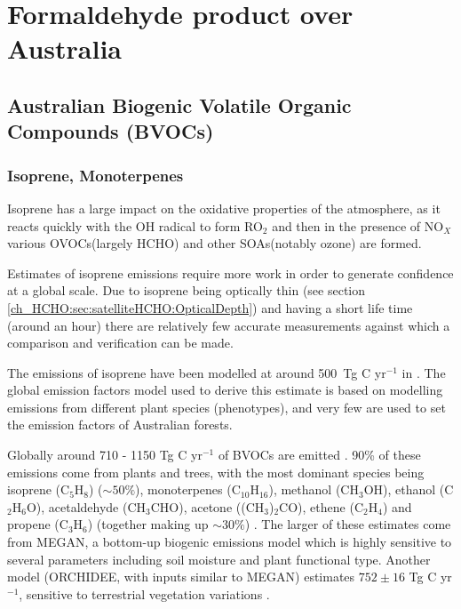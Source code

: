 
\chapter{Formaldehyde product over Australia} %
\label{ch_HCHO} %

\section{Australian Biogenic Volatile Organic Compounds (BVOCs)}
  \label{ch_HCHO:sec:bvoc}

  \subsection{Isoprene, Monoterpenes}
    
    Isoprene has a large impact on the oxidative properties of the atmosphere, as it reacts quickly with the OH radical to form RO$_2$ and then in the presence of NO$_X$ various OVOCs(largely HCHO) and other SOAs(notably ozone) are formed. 
    
    Estimates of isoprene emissions require more work in order to generate confidence at a global scale.
    Due to isoprene being optically thin (see section \ref{ch_HCHO:sec:satelliteHCHO:OpticalDepth}) and having a short life time (around an hour) there are relatively few accurate measurements against which a comparison and verification can be made.
    
    The emissions of isoprene have been modelled at around 500~Tg C yr$^{-1}$ in \citet{Guenther1995}.
    The global emission factors model used to derive this estimate is based on modelling emissions from different plant species (phenotypes), and very few are used to set the emission factors of Australian forests.
    
    Globally around 710 - 1150 Tg C yr$^{-1}$ of BVOCs are emitted \citep{Guenther1995,Lathiere2006,Guenther2012}.
    90\% of these emissions come from plants and trees, with the most dominant species being isoprene (C$_5$H$_8$) ($\sim50\%$), monoterpenes (C$_10$H$_16$), methanol (CH$_3$OH), ethanol (C$_2$H$_6$O), acetaldehyde (CH$_3$CHO), acetone ((CH$_3$)$_2$CO), ethene (C$_2$H$_4$) and propene (C$_3$H$_6$) (together making up $\sim30\%$) \citep{Guenther2012}.
    The larger of these estimates come from MEGAN, a bottom-up biogenic emissions model which is highly sensitive to several parameters including soil moisture and plant functional type.
    Another model (ORCHIDEE, with inputs similar to MEGAN) estimates $752\pm16$ Tg C yr$^{-1}$, sensitive to terrestrial vegetation variations \citep{Lathiere2006}.
    

